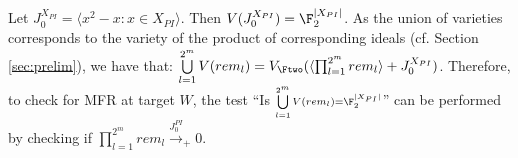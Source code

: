 
Let $J_0^{X_{PI}} = \langle x^2-x: x\in X_{PI}\rangle$. Then
$V(J_0^{X_{PI}}) = \F_2^{|X_{PI}|}$. As the union of varieties
corresponds to the variety of the product of corresponding ideals
(cf. Section \ref{sec:prelim}), we have that: 
$\bigcup\limits_{l=1}^{2^m}V(rem_l) =
V_{\Ftwo}( \langle \prod_{l=1}^{2^m} rem_l \rangle +
J_0^{X_{PI}} )$.  
Therefore, to check for MFR at target $W$, the test ``Is
${\scriptstyle \bigcup\limits_{l=1}^{2^m}V(rem_l) =
  \F_2^{|X_{PI}|}}$'' can be performed by checking if
$\prod_{l=1}^{2^m} rem_l\xrightarrow{J_{0}^{PI}}_+0$. 


